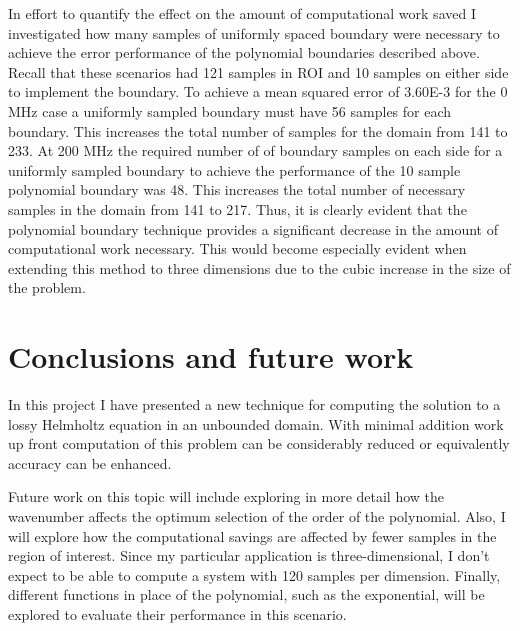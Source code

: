 \documentclass [11 pt, titlepage]{article}
\begin{document}
In effort to quantify the effect on the amount of computational work
saved I investigated how many samples of uniformly spaced boundary
were necessary to achieve the error performance of the polynomial
boundaries described above.  Recall that these scenarios had 121
samples in ROI and 10 samples on either side to implement the
boundary.  To achieve a mean squared error of 3.60E-3 for the 0 MHz
case a uniformly sampled boundary must have 56 samples for each
boundary.  This increases the total number of samples for the domain
from 141 to 233.  At 200 MHz the required number of of boundary
samples on each side for a uniformly sampled boundary to achieve the
performance of the 10 sample polynomial boundary was 48.  This
increases the total number of necessary samples in the domain from 141
to 217.  Thus, it is clearly evident that the polynomial boundary
technique provides a significant decrease in the amount of
computational work necessary.  This would become especially evident
when extending this method to three dimensions due to the cubic
increase in the size of the problem.

\section {Conclusions and future work}
\vspace {-4ex}
In this project I have presented a new technique for computing the
solution to a lossy Helmholtz equation in an unbounded domain.  With
minimal addition work up front computation of this problem can be
considerably reduced or equivalently accuracy can be enhanced.

Future work on this topic will include exploring in more detail how
the wavenumber affects the optimum selection of the order of the
polynomial.  Also, I will explore how the computational savings are
affected by fewer samples in the region of interest.  Since my
particular application is three-dimensional, I don't expect to be able
to compute a system with 120 samples per dimension.  Finally,
different functions in place of the polynomial, such as the
exponential, will be explored to evaluate their performance in this
scenario.


\end{document}
